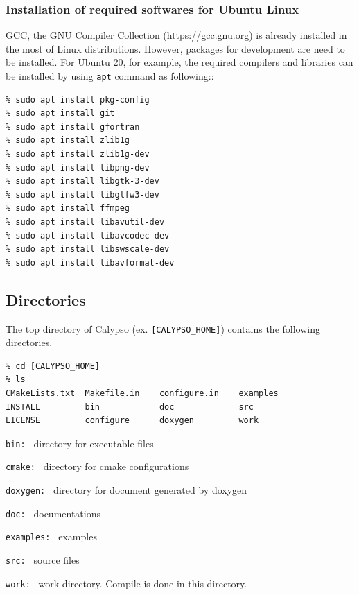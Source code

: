 \subsubsection{Installation of required softwares for Ubuntu Linux}
GCC, the GNU Compiler Collection (\url{https://gcc.gnu.org}) is already installed in the most of Linux distributions. However, packages for development are need to be installed. For Ubuntu 20, for example, the required compilers and  libraries can be installed by using \verb|apt| command as following::
%
\begin{verbatim}
% sudo apt install pkg-config
% sudo apt install git
% sudo apt install gfortran
% sudo apt install zlib1g
% sudo apt install zlib1g-dev
% sudo apt install libpng-dev
% sudo apt install libgtk-3-dev
% sudo apt install libglfw3-dev
% sudo apt install ffmpeg 
% sudo apt install libavutil-dev
% sudo apt install libavcodec-dev
% sudo apt install libswscale-dev
% sudo apt install libavformat-dev
\end{verbatim}
%
%

\subsection{Directories}

The top directory of Calypso (ex. \verb|[CALYPSO_HOME]|) contains the following directories.
\begin{verbatim}
% cd [CALYPSO_HOME]
% ls
CMakeLists.txt  Makefile.in    configure.in    examples
INSTALL         bin            doc             src
LICENSE         configure      doxygen         work

\end{verbatim}

\begin{description}
\item{\tt bin:      } directory for executable files
\item{\tt cmake:    } directory for cmake configurations
\item{\tt doxygen:  } directory for document generated by doxygen
\item{\tt doc:      } documentations
\item{\tt examples: } examples
\item{\tt src:      } source files
\item{\tt work:     } work directory. Compile is done in this directory.
\end{description}

